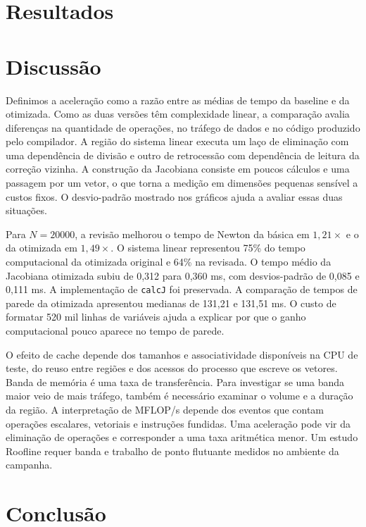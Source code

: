 \documentclass[11pt,a4paper]{article}
\begin{document}
\section{Resultados}

\ResultadosMedidos

\section{Discussão}

Definimos a aceleração como a razão entre as médias de tempo da baseline e da otimizada. Como as duas versões têm complexidade linear, a comparação avalia diferenças na quantidade de operações, no tráfego de dados e no código produzido pelo compilador. A região do sistema linear executa um laço de eliminação com uma dependência de divisão e outro de retrocessão com dependência de leitura da correção vizinha. A construção da Jacobiana consiste em poucos cálculos e uma passagem por um vetor, o que torna a medição em dimensões pequenas sensível a custos fixos. O desvio-padrão mostrado nos gráficos ajuda a avaliar essas duas situações.

Para $N=20000$, a revisão melhorou o tempo de Newton da básica em $1{,}21\times$ e o da otimizada em $1{,}49\times$. O sistema linear representou 75\% do tempo computacional da otimizada original e 64\% na revisada. O tempo médio da Jacobiana otimizada subiu de 0,312 para 0,360 ms, com desvios-padrão de 0,085 e 0,111 ms. A implementação de \texttt{calcJ} foi preservada. A comparação de tempos de parede da otimizada apresentou medianas de 131,21 e 131,51 ms. O custo de formatar 520 mil linhas de variáveis ajuda a explicar por que o ganho computacional pouco aparece no tempo de parede.

O efeito de cache depende dos tamanhos e associatividade disponíveis na CPU de teste, do reuso entre regiões e dos acessos do processo que escreve os vetores. Banda de memória é uma taxa de transferência. Para investigar se uma banda maior veio de mais tráfego, também é necessário examinar o volume e a duração da região. A interpretação de MFLOP/s depende dos eventos que contam operações escalares, vetoriais e instruções fundidas. Uma aceleração pode vir da eliminação de operações e corresponder a uma taxa aritmética menor. Um estudo Roofline requer banda e trabalho de ponto flutuante medidos no ambiente da campanha.

\section{Conclusão}
\end{document}
